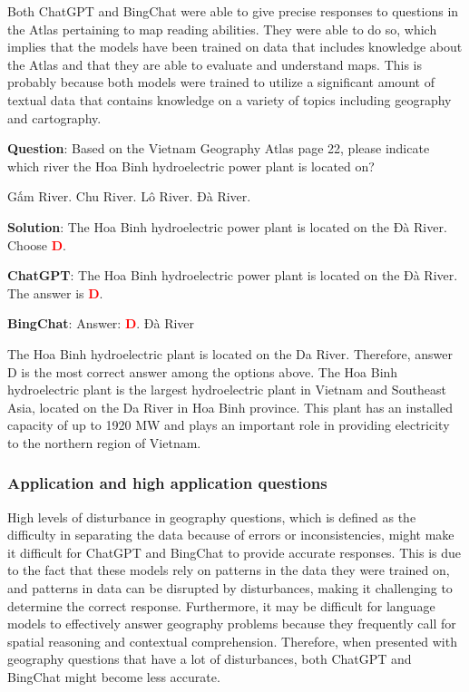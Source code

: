\documentclass{article}
\begin{document}
{	Both ChatGPT and BingChat were able to give precise responses to questions in the Atlas pertaining to map reading abilities. They were able to do so, which implies that the models have been trained on data that includes knowledge about the Atlas and that they are able to evaluate and understand maps. This is probably because both models were trained to utilize a significant amount of textual data that contains knowledge on a variety of topics including geography and cartography.
	
	
	
	\begin{mdframed}[linewidth=1pt,linecolor=red] \textbf{Question}: Based on the Vietnam Geography Atlas page 22, please indicate which river the Hoa Binh hydroelectric power plant is located on?
		
		
		
		\begin{oneparchoices}
			\choice Gấm River.
			\choice Chu River.
			\choice Lô River.
			\choice Đà River.
		\end{oneparchoices}
		
		\textbf{Solution}: The Hoa Binh hydroelectric power plant is located on the Đà River. Choose \textcolor{red}{\textbf{D}}.
		
		\textbf{ChatGPT}: The Hoa Binh hydroelectric power plant is located on the Đà River. The answer is \textcolor{red}{\textbf{D}}.


		\textbf{BingChat}: Answer: \textcolor{red}{\textbf{D}}. Đà River
		
		The Hoa Binh hydroelectric plant is located on the Da River. Therefore, answer D is the most correct answer among the options above. The Hoa Binh hydroelectric plant is the largest hydroelectric plant in Vietnam and Southeast Asia, located on the Da River in Hoa Binh province. This plant has an installed capacity of up to 1920 MW and plays an important role in providing electricity to the northern region of Vietnam.
		
		
	\end{mdframed}
	
	\subsubsection{Application and high application questions}
	
	\label{VNHSGE_Geo_Complex}
	
	High levels of disturbance in geography questions, which is defined as the difficulty in separating the data because of errors or inconsistencies, might make it difficult for ChatGPT and BingChat to provide accurate responses. This is due to the fact that these models rely on patterns in the data they were trained on, and patterns in data can be disrupted by disturbances, making it challenging to determine the correct response. Furthermore, it may be difficult for language models to effectively answer geography problems because they frequently call for spatial reasoning and contextual comprehension. Therefore, when presented with geography questions that have a lot of disturbances, both ChatGPT and BingChat might become less accurate.
	
}
\end{document}
